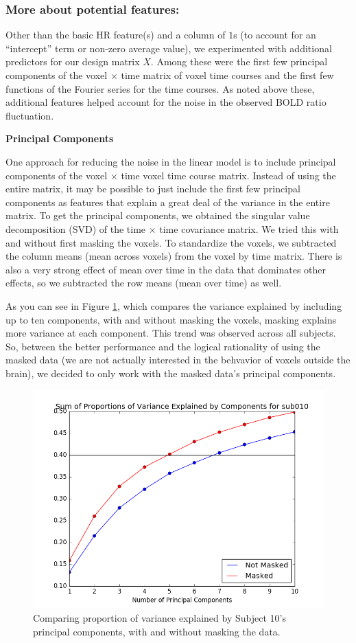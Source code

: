\subsubsection{More about potential features:}
\par Other than the basic HR feature(s) and a column of $1$s (to account 
for an ``intercept'' term or non-zero average value), we experimented with 
additional predictors for our design matrix $X$. Among these were the 
first few principal components of the voxel $\times$ time matrix of voxel time 
courses and the first few functions of the Fourier series for the time courses. 
As noted above these, additional features helped account for the noise in the 
observed BOLD ratio fluctuation.

\vspace{2mm}
\noindent \textbf{Principal Components}
\vspace{2mm}
\par One approach for reducing the noise in the linear model is to include 
principal components of the voxel $\times$ time voxel time course matrix. 
Instead of using the entire matrix, it may be possible to just include the 
first few principal components as features that explain a great deal of the 
variance in the entire matrix. To get the principal components, we obtained 
the singular value decomposition (SVD) of the time $\times$ time covariance 
matrix. We tried this with and without first masking the voxels. To 
standardize the voxels, we subtracted the column means (mean across voxels) 
from the voxel by time matrix. There is also a very strong effect of mean 
over time in the data that dominates other effects, so we subtracted the 
row means (mean over time) as well.

As you can see in Figure \ref{fig:pca10}, which compares the variance 
explained by including up to ten components, with and without masking the 
voxels, masking explains more variance at each component. This trend was 
observed across all subjects. So, between the better performance and the 
logical rationality of using the masked data (we are not actually interested 
in the behvavior of voxels outside the brain), we decided to only work with 
the masked data's principal components. 

\begin{figure}[ht]
	\centering
	\includegraphics[width=.5\linewidth]{../images/pcacumsumssub010.png}
 	\caption{Comparing proportion of variance explained by Subject 10's 
principal components, with and without masking the data.}
 	\label{fig:pca10}
\end{figure}

